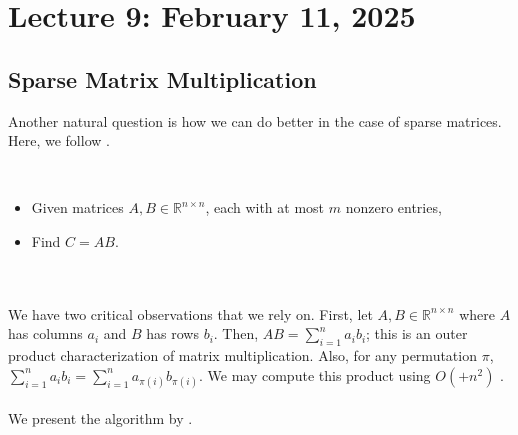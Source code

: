 \pagebreak

\section{Lecture 9: February 11, 2025}

    \subsection{Sparse Matrix Multiplication}

        Another natural question is how we can do better in the case of sparse matrices. Here, we follow \cite{yuster2005fastsparse}.
        \begin{compprob} \label{prob:sparsematmul}
            \vphantom
            \\
            \begin{itemize}
                \item Given matrices \(A,B\in\mathbb{R}^{n\times n}\), each with at most \(m\) nonzero entries,
                \item Find \(C=AB\).
            \end{itemize}
        \end{compprob}
        \vphantom
        \\
        \\
        We have two critical observations that we rely on. First, let \(A,B\in\mathbb{R}^{n\times n}\) where \(A\) has columns \(a_i\) and \(B\) has rows \(b_i\). Then, \(AB=\sum_{i=1}^n a_ib_i\); this is an outer product characterization of matrix multiplication. Also, for any permutation \(\pi\), \(\sum_{i=1}^n a_ib_i=\sum_{i=1}^n a_{\pi(i)}b_{\pi(i)}\). We may compute this product using \(O\left(+n^2\right)\) .
        \\
        \\
        We present the algorithm by \cite{yuster2005fastsparse}. 
